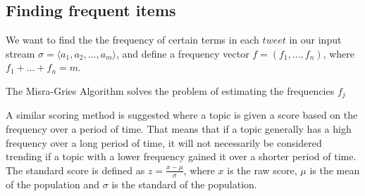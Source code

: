 \subsection{Finding frequent items}\label{algo-frequent}
We want to find the the frequency of certain terms in each $tweet$ in our input stream $\sigma = \langle a_{1}, a_{2},...,a_{m}\rangle$, and define a frequency vector $f = (f_{1},...,f_{n})$, where $f_{1} + ... + f_{n} = m$. 

The Misra-Gries Algorithm solves the problem of estimating the frequencies $f_{j}$ \cite{Amit}

A similar scoring method is suggested where a topic is given a score based on the frequency over a period of time. That means that if a topic generally has a high frequency over a long period of time, it will not necessarily be considered trending if a topic with a lower frequency gained it over a shorter period of time. The standard score is defined as $z = \frac{x - \mu}{\sigma}$, where $x$ is the raw score, $\mu$ is the mean of the population and $\sigma$ is the standard of the population.